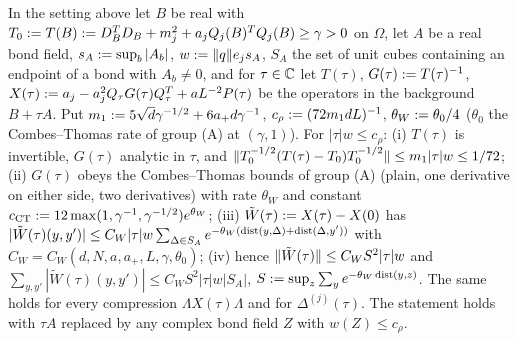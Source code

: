 \begin{lemma}\label{lem:a06d:S1}
In the setting above let $B$ be real with $T_0:= T(B):= D_B^TD_B+m_j^2+a_jQ_j(B)^TQ_j(B)\ge\gamma>0$ on $\Omega$, let $A$ be a real bond field, $s_A:=\sup_b|A_b|$, $w:=\lVert q\rVert e_js_A$, $S_A$ the set of unit cubes containing an endpoint of a bond with $A_b\ne0$, and for $\tau\in\mathbb C$ let $T(\tau)$, $G(\tau):= T(\tau)^{-1}$, $X(\tau):= a_j-a_j^2Q_\tau G(\tau)Q_\tau^T+aL^{-2}P(\tau)$ be the operators in the background $B+\tau A$. Put $m_1:=5\sqrt d\gamma^{-1/2}+6a_+d\gamma^{-1}$, $c_\rho:=(72m_1dL)^{-1}$, $\theta_W:=\theta_0/4$ ($\theta_0$ the Combes--Thomas rate of group (A) at $(\gamma,1)$). For $|\tau|w\le c_\rho$: \textup{(i)} $T(\tau)$ is invertible, $G(\tau)$ analytic in $\tau$, and $\lVert T_0^{-1/2}(T(\tau)-T_0)T_0^{-1/2}\rVert\le m_1|\tau|w\le1/72$; \textup{(ii)} $G(\tau)$ obeys the Combes--Thomas bounds of group (A) (plain, one derivative on either side, two derivatives) with rate $\theta_W$ and constant $c_{\mathrm{CT}}:=12\max(1,\gamma^{-1},\gamma^{-1/2})e^{\theta_W}$; \textup{(iii)} $\tilde W(\tau):= X(\tau)-X(0)$ has $|\tilde W(\tau)(y,y')|\le C_W|\tau|w\sum_{\Delta\in S_A}e^{-\theta_W(\operatorname{dist}(y,\Delta)+\operatorname{dist}(\Delta,y'))}$ with $C_W=C_W(d,N,a,a_+,L,\gamma,\theta_0)$; \textup{(iv)} hence $\lVert \tilde W(\tau)\rVert\le C_WS^2|\tau|w$ and $\sum_{y,y'}|\tilde W(\tau)(y,y')|\le C_WS^2|\tau|w|S_A|$, $S:=\sup_z\sum_ye^{-\theta_W\operatorname{dist}(y,z)}$. The same holds for every compression $\Lambda X(\tau)\Lambda$ and for $\Delta^{(j)}(\tau)$. The statement holds with $\tau A$ replaced by any complex bond field $Z$ with $w(Z)\le c_\rho$.
\end{lemma}


